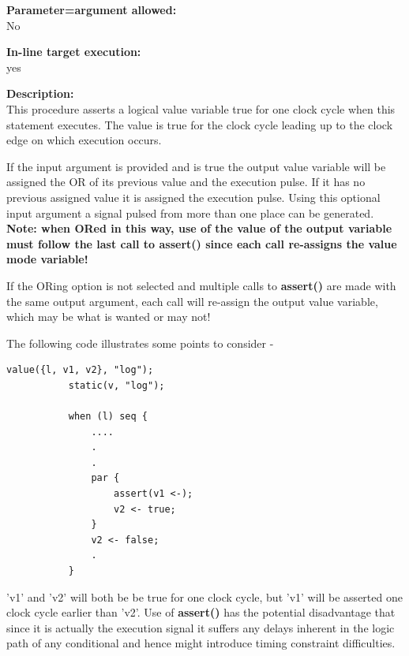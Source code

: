         {\bf Parameter=argument allowed:} \\
        No
        
        {\bf In-line target execution:} \\
        yes
        
        {\bf Description:} \\
        This procedure asserts a logical value variable true for one clock cycle
        when this statement executes. The value is true for the clock cycle
        leading up to the clock edge on which execution occurs.

        If the input argument is provided and is true the output value variable
        will be assigned the OR of its previous value and the execution pulse.
        If it has no previous assigned value it is assigned the execution pulse.
        Using this optional input argument a signal pulsed from more than one
        place can be generated. {\bf Note: when ORed in this way, use of the
        value of the output variable must follow the last call to assert() since
        each call re-assigns the value mode variable!}

        If the ORing option is not selected and multiple calls to
        {\bf assert()} are made with the same output argument, each call will
        re-assign the output value variable, which may be what is wanted or
        may not!
        
        The following code illustrates some points to consider -
        \begin{lstlisting}[gobble=8, language=threepl]
           value({l, v1, v2}, "log");
           static(v, "log");

           when (l) seq {
               ....
               .
               .
               par {
                   assert(v1 <-);
                   v2 <- true;
               }
               v2 <- false;
               .
           }
        \end{lstlisting}
        
        'v1' and 'v2' will both be be true for one clock cycle, but 'v1' will
        be asserted one clock cycle earlier than 'v2'. Use of {\bf assert()}
        has the potential disadvantage that since it is actually the execution
        signal it suffers any delays inherent in the logic path of any
        conditional and hence might introduce timing constraint difficulties.
        
